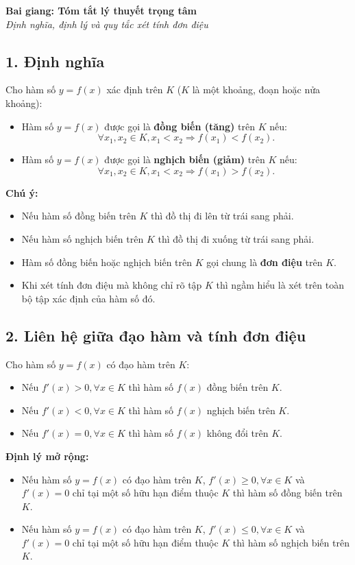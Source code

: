 \documentclass[12pt,a4paper]{article}
\newenvironment{lesson}[2]{\vspace{1em}\noindent\textbf{\Large Bai giang: #1}\\\textit{#2}\par}{}
\begin{document}
\begin{lesson}{Tóm tắt lý thuyết trọng tâm}{Định nghĩa, định lý và quy tắc xét tính đơn điệu}
\subsection{1. Định nghĩa}
Cho hàm số $y = f(x)$ xác định trên $K$ ($K$ là một khoảng, đoạn hoặc nửa khoảng):
\begin{itemize}
    \item Hàm số $y = f(x)$ được gọi là \textbf{đồng biến (tăng)} trên $K$ nếu:
    $$\forall x_1, x_2 \in K, x_1 < x_2 \Rightarrow f(x_1) < f(x_2).$$
    \item Hàm số $y = f(x)$ được gọi là \textbf{nghịch biến (giảm)} trên $K$ nếu:
    $$\forall x_1, x_2 \in K, x_1 < x_2 \Rightarrow f(x_1) > f(x_2).$$
\end{itemize}

\textbf{Chú ý:}
\begin{itemize}
    \item Nếu hàm số đồng biến trên $K$ thì đồ thị đi lên từ trái sang phải.
    \item Nếu hàm số nghịch biến trên $K$ thì đồ thị đi xuống từ trái sang phải.
    \item Hàm số đồng biến hoặc nghịch biến trên $K$ gọi chung là \textbf{đơn điệu} trên $K$.
    \item Khi xét tính đơn điệu mà không chỉ rõ tập $K$ thì ngầm hiểu là xét trên toàn bộ tập xác định của hàm số đó.
\end{itemize}

\subsection{2. Liên hệ giữa đạo hàm và tính đơn điệu}
Cho hàm số $y = f(x)$ có đạo hàm trên $K$:
\begin{itemize}
    \item Nếu $f'(x) > 0, \forall x \in K$ thì hàm số $f(x)$ đồng biến trên $K$.
    \item Nếu $f'(x) < 0, \forall x \in K$ thì hàm số $f(x)$ nghịch biến trên $K$.
    \item Nếu $f'(x) = 0, \forall x \in K$ thì hàm số $f(x)$ không đổi trên $K$.
\end{itemize}

\textbf{Định lý mở rộng:}
\begin{itemize}
    \item Nếu hàm số $y = f(x)$ có đạo hàm trên $K$, $f'(x) \ge 0, \forall x \in K$ và $f'(x) = 0$ chỉ tại một số hữu hạn điểm thuộc $K$ thì hàm số đồng biến trên $K$.
    \item Nếu hàm số $y = f(x)$ có đạo hàm trên $K$, $f'(x) \le 0, \forall x \in K$ và $f'(x) = 0$ chỉ tại một số hữu hạn điểm thuộc $K$ thì hàm số nghịch biến trên $K$.
\end{itemize}


\end{lesson}
\end{document}
